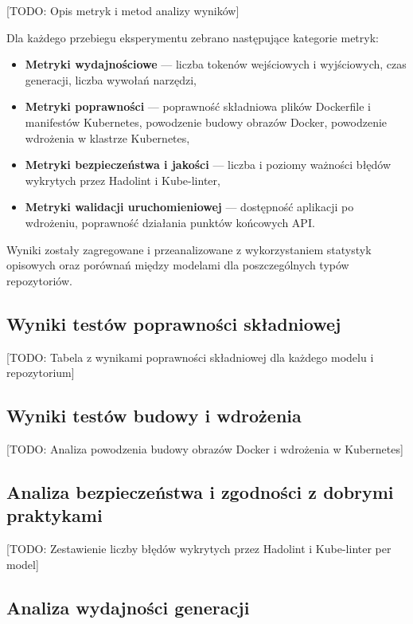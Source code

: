 [TODO: Opis metryk i metod analizy wyników]

Dla każdego przebiegu eksperymentu zebrano następujące kategorie metryk:
\begin{itemize}
    \item \textbf{Metryki wydajnościowe} — liczba tokenów wejściowych i wyjściowych, czas generacji, liczba wywołań narzędzi,
    \item \textbf{Metryki poprawności} — poprawność składniowa plików Dockerfile i manifestów Kubernetes, powodzenie budowy obrazów Docker, powodzenie wdrożenia w klastrze Kubernetes,
    \item \textbf{Metryki bezpieczeństwa i jakości} — liczba i poziomy ważności błędów wykrytych przez Hadolint i Kube-linter,
    \item \textbf{Metryki walidacji uruchomieniowej} — dostępność aplikacji po wdrożeniu, poprawność działania punktów końcowych API.
\end{itemize}

Wyniki zostały zagregowane i przeanalizowane z wykorzystaniem statystyk opisowych oraz porównań między modelami dla poszczególnych typów repozytoriów.

\subsection{Wyniki testów poprawności składniowej}

[TODO: Tabela z wynikami poprawności składniowej dla każdego modelu i repozytorium]

\subsection{Wyniki testów budowy i wdrożenia}

[TODO: Analiza powodzenia budowy obrazów Docker i wdrożenia w Kubernetes]

\subsection{Analiza bezpieczeństwa i zgodności z dobrymi praktykami}

[TODO: Zestawienie liczby błędów wykrytych przez Hadolint i Kube-linter per model]

\subsection{Analiza wydajności generacji}

